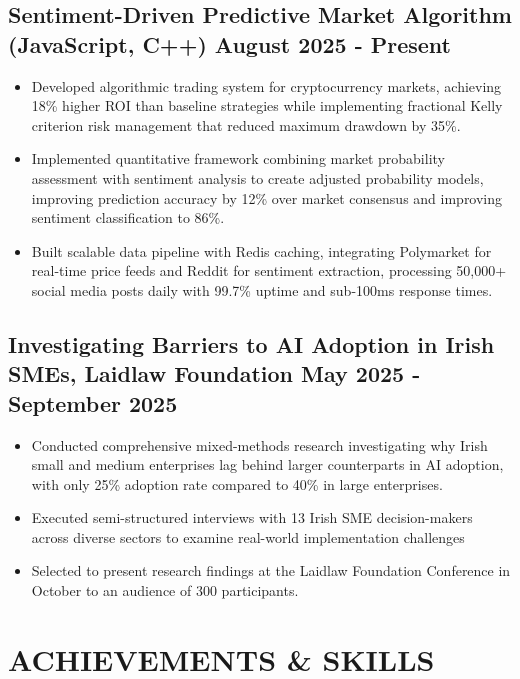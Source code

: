 \documentclass[10pt,a4paper]{article}
\begin{document}
\subsection{Sentiment-Driven Predictive Market Algorithm (JavaScript, C++) \hfill August 2025 - Present}
\begin{itemize}
\item Developed algorithmic trading system for cryptocurrency markets, achieving 18\% higher ROI than baseline strategies while implementing fractional Kelly criterion risk management that reduced maximum drawdown by 35\%.
\item Implemented quantitative framework combining market probability assessment with sentiment analysis to create adjusted probability models, improving prediction accuracy by 12\% over market consensus and improving sentiment classification to 86\%.
\item Built scalable data pipeline with Redis caching, integrating Polymarket for real-time price feeds and Reddit for sentiment extraction, processing 50,000+ social media posts daily with 99.7\% uptime and sub-100ms response times.
\end{itemize}

\subsection{Investigating Barriers to AI Adoption in Irish SMEs, Laidlaw Foundation \hfill May 2025 - September 2025}
\begin{itemize}
\item Conducted comprehensive mixed-methods research investigating why Irish small and medium enterprises lag behind larger counterparts in AI adoption, with only 25\% adoption rate compared to 40\% in large enterprises.
\item Executed semi-structured interviews with 13 Irish SME decision-makers across diverse sectors to examine real-world implementation challenges
\item Selected to present research findings at the Laidlaw Foundation Conference in October to an audience of 300 participants.
\end{itemize}

\section{ACHIEVEMENTS \& SKILLS}
\end{document}
